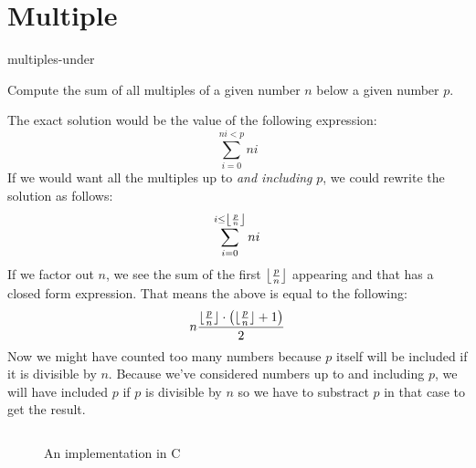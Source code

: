 \documentclass[main.tex]{subfiles}
\begin{document}
\chapter{Multiple}

\begin{libraryfile}
  \begin{algorithm}{1}{1}{multiples-under}
    \begin{algorithm-description}
      Compute the sum of all multiples of a given number $n$ below a given number $p$.
    \end{algorithm-description}
    \begin{algorithm-explanation}
      The exact solution would be the value of the following expression:
      \[ \sum_{i=0}^{ni < p}ni \]
      If we would want all the multiples up to \textit{and including} $p$, we could rewrite the solution as follows:
      \[ \sum_{i=0}^{i \le \floor*{\frac{p}{n}}}ni \]
      If we factor out $n$, we see the sum of the first $\floor*{\frac{p}{n}}$ appearing and that has a closed form expression.
      That means the above is equal to the following:
      \[ n\frac{\floor{\frac{p}{n}}\cdot \left(\floor{\frac{p}{n}} + 1\right)}{2} \]
      Now we might have counted too many numbers because $p$ itself will be included if it is divisible by $n$.
      Because we've considered numbers up to and including $p$, we will have included $p$ if $p$ is divisible by $n$ so we have to substract $p$ in that case to get the result.

      \begin{figure}[H]
        \centering
        \inputminted[firstline=6, lastline=9]{c}{\lib{c}{multiple.c}}
        \caption{An implementation in C}
      \end{figure}
    \end{algorithm-explanation}
  \end{algorithm}
\end{libraryfile}
\end{document}
